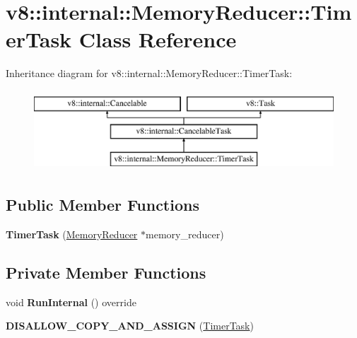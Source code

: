 \hypertarget{classv8_1_1internal_1_1_memory_reducer_1_1_timer_task}{}\section{v8\+:\+:internal\+:\+:Memory\+Reducer\+:\+:Timer\+Task Class Reference}
\label{classv8_1_1internal_1_1_memory_reducer_1_1_timer_task}
Inheritance diagram for v8\+:\+:internal\+:\+:Memory\+Reducer\+:\+:Timer\+Task\+:\begin{figure}[H]
\begin{center}
\leavevmode
\includegraphics[height=3.000000cm]{classv8_1_1internal_1_1_memory_reducer_1_1_timer_task}
\end{center}
\end{figure}
\subsection*{Public Member Functions}
\begin{DoxyCompactItemize}
\item 
{\bfseries Timer\+Task} (\hyperlink{classv8_1_1internal_1_1_memory_reducer}{Memory\+Reducer} $\ast$memory\+\_\+reducer)\hypertarget{classv8_1_1internal_1_1_memory_reducer_1_1_timer_task_a6c4466d3ac2e3e3a049fc747aea2b046}{}\label{classv8_1_1internal_1_1_memory_reducer_1_1_timer_task_a6c4466d3ac2e3e3a049fc747aea2b046}

\end{DoxyCompactItemize}
\subsection*{Private Member Functions}
\begin{DoxyCompactItemize}
\item 
void {\bfseries Run\+Internal} () override\hypertarget{classv8_1_1internal_1_1_memory_reducer_1_1_timer_task_a3f76da90e686248e5509759855151b5c}{}\label{classv8_1_1internal_1_1_memory_reducer_1_1_timer_task_a3f76da90e686248e5509759855151b5c}

\item 
{\bfseries D\+I\+S\+A\+L\+L\+O\+W\+\_\+\+C\+O\+P\+Y\+\_\+\+A\+N\+D\+\_\+\+A\+S\+S\+I\+GN} (\hyperlink{classv8_1_1internal_1_1_memory_reducer_1_1_timer_task}{Timer\+Task})\hypertarget{classv8_1_1internal_1_1_memory_reducer_1_1_timer_task_a894f039ea6ceac48781f00bff0f8526f}{}\label{classv8_1_1internal_1_1_memory_reducer_1_1_timer_task_a894f039ea6ceac48781f00bff0f8526f}

\end{DoxyCompactItemize}
